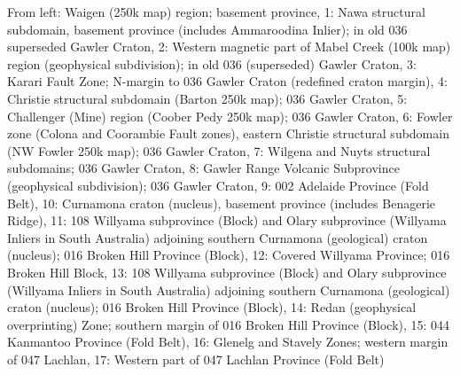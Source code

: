From left: Waigen (250k map) region; basement province, 1: Nawa structural subdomain, basement province (includes Ammaroodina Inlier); in old 036 {superseded} Gawler Craton, 2: Western magnetic part of Mabel Creek (100k map) region (geophysical subdivision); in old 036 (superseded) Gawler Craton, 3: Karari Fault Zone; N-margin to 036 Gawler Craton (redefined craton margin), 4: Christie structural subdomain (Barton 250k map); 036 Gawler Craton, 5: Challenger (Mine) region (Coober Pedy 250k map); 036 Gawler Craton, 6: Fowler zone (Colona and Coorambie Fault zones), eastern Christie structural subdomain (NW Fowler 250k map); 036 Gawler Craton, 7: Wilgena and Nuyts structural subdomains; 036 Gawler Craton, 8: Gawler Range Volcanic Subprovince (geophysical subdivision); 036 Gawler Craton, 9: 002 Adelaide Province (Fold Belt), 10: Curnamona craton (nucleus), basement province (includes Benagerie Ridge), 11: 108 Willyama subprovince (Block) and Olary subprovince (Willyama Inliers in South Australia) adjoining southern Curnamona (geological) craton (nucleus); 016 Broken Hill Province (Block), 12: Covered Willyama Province; 016 Broken Hill Block, 13: 108 Willyama subprovince (Block) and Olary subprovince (Willyama Inliers in South Australia) adjoining southern Curnamona (geological) craton (nucleus); 016 Broken Hill Province (Block), 14: Redan (geophysical overprinting) Zone; southern margin of 016 Broken Hill Province (Block), 15: 044 Kanmantoo Province (Fold Belt), 16: Glenelg and Stavely Zones; western margin of 047 Lachlan, 17: Western part of 047 Lachlan Province (Fold Belt)
